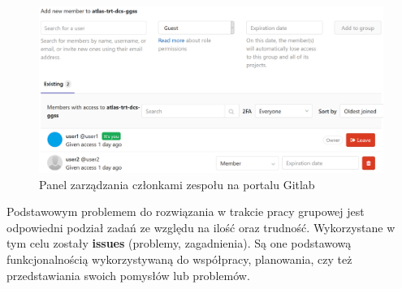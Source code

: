 \begin{figure}[H]
\centering
\caption{Panel zarządzania członkami zespołu na portalu Gitlab}
\label{fig:memMan}
\includegraphics[width=\textwidth]{res/png/memberManagementPanel}
\end{figure}


Podstawowym problemem do rozwiązania w trakcie pracy grupowej jest odpowiedni podział zadań ze względu na ilość oraz trudność. Wykorzystane w tym celu zostały \textbf{issues} (problemy, zagadnienia). Są one podstawową funkcjonalnością wykorzystywaną do współpracy, planowania, czy też przedstawiania swoich pomysłów lub problemów.

